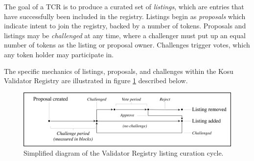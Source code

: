 \documentclass[10pt]{article}
\begin{document}
The goal of a TCR is to produce a curated set of \textit{listings}, which are entries that have successfully been included in the registry. Listings begin as \textit{proposals} which indicate intent to join the registry, backed by a number of tokens. Proposals and listings may be \textit{challenged} at any time, where a challenger must put up an equal number of tokens as the listing or proposal owner. Challenges trigger votes, which any token holder may participate in. 
\medskip

The specific mechanics of listings, proposals, and challenges within the Kosu Validator Registry are illustrated in figure \ref{fig:fig3} described below. 
\medskip

\begin{figure}[H]
  \centering
  \includegraphics[width=\textwidth]{../figures/fig3.png}
  \caption{Simplified diagram of the Validator Registry listing curation cycle.}
  \label{fig:fig3}
\end{figure}
\end{document}
